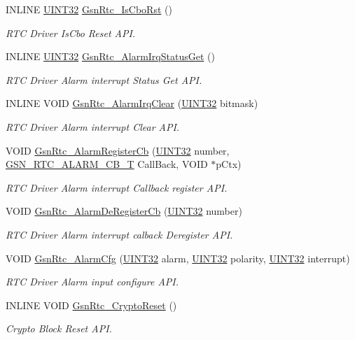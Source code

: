 \begin{DoxyCompactItemize}
INLINE \hyperlink{a00660_gae1e6edbbc26d6fbc71a90190d0266018}{UINT32} \hyperlink{a00651_ga1f5315d552e66d73b39f0f328f4e6005}{GsnRtc\_\-IsCboRst} ()
\begin{DoxyCompactList}\small\item\em RTC Driver IsCbo Reset API. \end{DoxyCompactList}\item 
INLINE \hyperlink{a00660_gae1e6edbbc26d6fbc71a90190d0266018}{UINT32} \hyperlink{a00651_gafcd931e3dc1dbfe114beb37e38eb2f78}{GsnRtc\_\-AlarmIrqStatusGet} ()
\begin{DoxyCompactList}\small\item\em RTC Driver Alarm interrupt Status Get API. \end{DoxyCompactList}\item 
INLINE VOID \hyperlink{a00651_ga4f7823684634c18971a213e32d4ebcf1}{GsnRtc\_\-AlarmIrqClear} (\hyperlink{a00660_gae1e6edbbc26d6fbc71a90190d0266018}{UINT32} bitmask)
\begin{DoxyCompactList}\small\item\em RTC Driver Alarm interrupt Clear API. \end{DoxyCompactList}\item 
VOID \hyperlink{a00651_ga2b1fc2ebca2e882feb0edf4dcce10ae1}{GsnRtc\_\-AlarmRegisterCb} (\hyperlink{a00660_gae1e6edbbc26d6fbc71a90190d0266018}{UINT32} number, \hyperlink{a00582_a624c15b10850050c5064e7949e4bd15f}{GSN\_\-RTC\_\-ALARM\_\-CB\_\-T} CallBack, VOID $\ast$pCtx)
\begin{DoxyCompactList}\small\item\em RTC Driver Alarm interrupt Callback register API. \end{DoxyCompactList}\item 
VOID \hyperlink{a00651_ga113ab50d758e2a3aa9231666c14e5caa}{GsnRtc\_\-AlarmDeRegisterCb} (\hyperlink{a00660_gae1e6edbbc26d6fbc71a90190d0266018}{UINT32} number)
\begin{DoxyCompactList}\small\item\em RTC Driver Alarm interrupt calback Deregister API. \end{DoxyCompactList}\item 
VOID \hyperlink{a00651_ga6fc5ea8da5e29c2fa1363b0a3a6c6e4a}{GsnRtc\_\-AlarmCfg} (\hyperlink{a00660_gae1e6edbbc26d6fbc71a90190d0266018}{UINT32} alarm, \hyperlink{a00660_gae1e6edbbc26d6fbc71a90190d0266018}{UINT32} polarity, \hyperlink{a00660_gae1e6edbbc26d6fbc71a90190d0266018}{UINT32} interrupt)
\begin{DoxyCompactList}\small\item\em RTC Driver Alarm input configure API. \end{DoxyCompactList}\item 
INLINE VOID \hyperlink{a00651_gabd93fb337eb2179a3a9d5073c869037e}{GsnRtc\_\-CryptoReset} ()
\begin{DoxyCompactList}\small\item\em Crypto Block Reset API. \end{DoxyCompactList}\end{DoxyCompactItemize}


